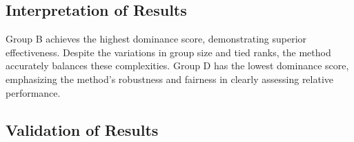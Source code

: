 \documentclass[man,floatsintext]{apa7}
\begin{document}
\subsection{Interpretation of Results}

Group B achieves the highest dominance score, demonstrating superior effectiveness. Despite the variations in group size and tied ranks, the method accurately balances these complexities. Group D has the lowest dominance score, emphasizing the method’s robustness and fairness in clearly assessing relative performance.

\subsection{Validation of Results}

\printbibliography
\appendix
\end{document}
